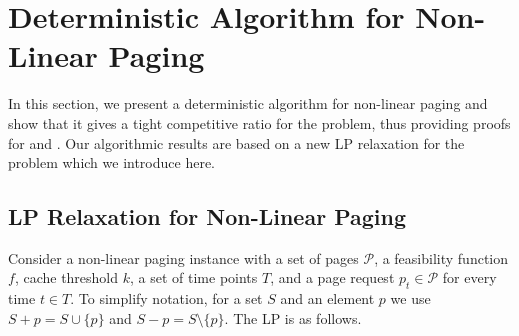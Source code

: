 \documentclass[11pt]{article}
\newcommand{\cP}{{\mathcal{P}}}
\newcommand{\om}{{\Omega}}
\begin{document}



\section{Deterministic Algorithm for Non-Linear Paging}
\label{sec:algUneweighted}

In this section, we present a deterministic algorithm for non-linear paging and show that it gives a tight competitive ratio for the problem, thus providing proofs for  and . Our algorithmic results are based on a new LP relaxation for the problem which we introduce here.

\subsection{LP Relaxation for Non-Linear Paging}
\label{sec:LP}

   Consider a non-linear paging instance with a set of pages $\cP$, a feasibility function $f$, cache threshold $k$, a set of time points $T$, and a page request $p_t \in \cP$ for every time $t \in T$. To simplify notation, for a set $S$ and an element $p$ we use $S+p = S \cup \{p\}$ and $S-p = S \setminus \{p\}$. The LP is as follows.
 
\end{document}
